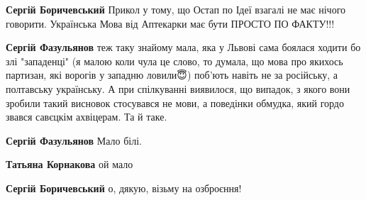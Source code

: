 \begin{itemize}
\begin{itemize}
 
\textbf{Сергій Боричевський} Прикол у тому, що Остап по Ідеї взагалі не має
нічого говорити. Українська Мова від Аптекарки має бути ПРОСТО ПО ФАКТУ!!!

 
\textbf{Сергій Фазульянов} теж таку знайому мала, яка у Львові сама боялася ходити бо злі "западенці" (я малою коли чула це слово, то думала, що мова про якихось партизан, які ворогів у западню ловили😇) поб'ють навіть не за російську, а полтавську українську. А при спілкуванні виявилося, що випадок, з якого вони зробили такий висновок стосувався не мови, а поведінки обмудка, який гордо звався савєцкім ахвіцерам. Та й таке.🧐

 
\textbf{Сергій Фазульянов} Мало білі.

 
\textbf{Татьяна Корнакова} ой мало

 
\textbf{Сергій Боричевський} о, дякую, візьму на озброєння!

 

\end{itemize}
\end{itemize}
